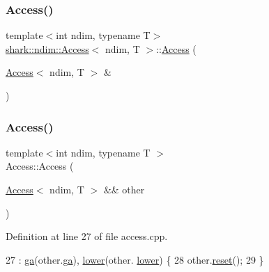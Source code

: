 \subsubsection{\texorpdfstring{Access()}{Access()}\hspace{0.1cm}{\footnotesize\ttfamily [4/5]}}
{\footnotesize\ttfamily template$<$int ndim, typename T$>$ \\
\hyperlink{classshark_1_1ndim_1_1_access}{shark\+::ndim\+::\+Access}$<$ ndim, T $>$\+::\hyperlink{classshark_1_1ndim_1_1_access}{Access} (\begin{DoxyParamCaption}\item[{\hyperlink{classshark_1_1ndim_1_1_access}{Access}$<$ ndim, T $>$ \&}]{ }\end{DoxyParamCaption})\hspace{0.3cm}{\ttfamily [delete]}}

\hypertarget{classshark_1_1ndim_1_1_access_abbc49fde47e1da6c01ca28ee881544a8}{}\label{classshark_1_1ndim_1_1_access_abbc49fde47e1da6c01ca28ee881544a8} 
\subsubsection{\texorpdfstring{Access()}{Access()}\hspace{0.1cm}{\footnotesize\ttfamily [5/5]}}
{\footnotesize\ttfamily template$<$int ndim, typename T $>$ \\
Access\+::\+Access (\begin{DoxyParamCaption}\item[{\hyperlink{classshark_1_1ndim_1_1_access}{Access}$<$ ndim, T $>$ \&\&}]{other }\end{DoxyParamCaption})}



Definition at line 27 of file access.\+cpp.


\begin{DoxyCode}
27                                             : \hyperlink{classshark_1_1ndim_1_1_access_abc59e261a07fcecc3f1db641ef04efa7}{ga}(other.\hyperlink{classshark_1_1ndim_1_1_access_abc59e261a07fcecc3f1db641ef04efa7}{ga}), \hyperlink{classshark_1_1ndim_1_1_access_ac1e92dba307ff877963c94bd42fcbafb}{lower}(other.
      \hyperlink{classshark_1_1ndim_1_1_access_ac1e92dba307ff877963c94bd42fcbafb}{lower}) \{
28     other.\hyperlink{classshark_1_1ndim_1_1_access_ae3aeb7637a41a2da81bcda20772ccac4}{reset}();
29 \}
\end{DoxyCode}
\hypertarget{classshark_1_1ndim_1_1_access_a2957f851de845382e05955892506a2f1}{}\label{classshark_1_1ndim_1_1_access_a2957f851de845382e05955892506a2f1} 
